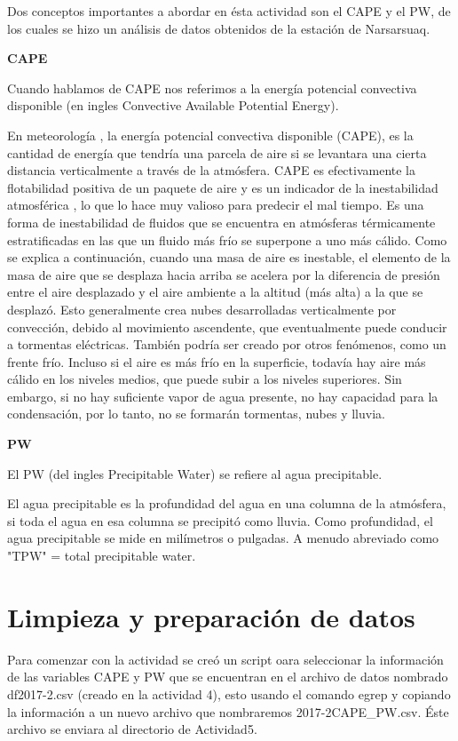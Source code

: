 \documentclass[12pt]{article}
\begin{document}
Dos conceptos importantes a abordar en ésta actividad son el CAPE y el PW, de los cuales se hizo un análisis de datos obtenidos de la estación de Narsarsuaq.

\textbf{CAPE}

Cuando hablamos de CAPE nos referimos a la energía potencial convectiva disponible (en ingles Convective Available Potential Energy). 

En meteorología , la energía potencial convectiva disponible (CAPE), es la cantidad de energía que tendría una parcela de aire si se levantara una cierta distancia verticalmente a través de la atmósfera. CAPE es efectivamente la flotabilidad positiva de un paquete de aire y es un indicador de la inestabilidad atmosférica , lo que lo hace muy valioso para predecir el mal tiempo. Es una forma de inestabilidad de fluidos que se encuentra en atmósferas térmicamente estratificadas en las que un fluido más frío se superpone a uno más cálido. Como se explica a continuación, cuando una masa de aire es inestable, el elemento de la masa de aire que se desplaza hacia arriba se acelera por la diferencia de presión entre el aire desplazado y el aire ambiente a la altitud (más alta) a la que se desplazó. Esto generalmente crea nubes desarrolladas verticalmente por convección, debido al movimiento ascendente, que eventualmente puede conducir a tormentas eléctricas. También podría ser creado por otros fenómenos, como un frente frío. Incluso si el aire es más frío en la superficie, todavía hay aire más cálido en los niveles medios, que puede subir a los niveles superiores. Sin embargo, si no hay suficiente vapor de agua presente, no hay capacidad para la condensación, por lo tanto, no se formarán tormentas, nubes y lluvia.

\textbf{PW}

El PW (del ingles Precipitable Water) se refiere al agua precipitable.

El agua precipitable es la profundidad del agua en una columna de la atmósfera, si toda el agua en esa columna se precipitó como lluvia. Como profundidad, el agua precipitable se mide en milímetros o pulgadas. A menudo abreviado como "TPW" = total precipitable water.

\section{Limpieza y preparación de datos}

Para comenzar con la actividad se creó un script oara seleccionar la información de las variables CAPE y PW que se encuentran en el archivo de datos nombrado df2017-2.csv (creado en la actividad 4), esto usando el comando egrep y copiando la información a un nuevo archivo que nombraremos 2017-2CAPE\_PW.csv. Éste archivo se enviara al directorio de Actividad5.
\end{document}
